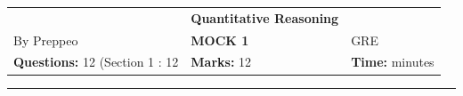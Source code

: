 \documentclass[11pt,paper=a4,answers]{exam}
\begin{document}
\begin{center}
  \renewcommand{\arraystretch}{1.5}
  \begin{tabularx}{\textwidth}{YYY}
    & \normalsize\bf{\Large{Quantitative Reasoning}} &
    \\
    By Preppeo & \normalsize\bf{MOCK 1} & GRE\\
    \normalsize{\textbf{Questions:} 12 (Section 1 : 12 } & \normalsize{\textbf{Marks:} 12 } & \normalsize{\textbf{Time:}  minutes } \\
  \end{tabularx}
\end{center}
\par\noindent\rule{\textwidth}{1pt}
\end{document}
